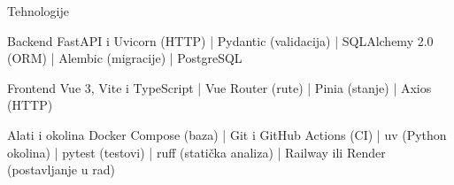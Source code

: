 

\begin{frame}{Tehnologije}
\begin{block}{Backend}
FastAPI i Uvicorn (HTTP) \;|\; Pydantic (validacija) \;|\; SQLAlchemy 2.0 (ORM) \;|\; Alembic (migracije) \;|\; PostgreSQL
\end{block}

\begin{block}{Frontend}
Vue 3, Vite i TypeScript \;|\; Vue Router (rute) \;|\; Pinia (stanje) \;|\; Axios (HTTP)
\end{block}

\begin{block}{Alati i okolina}
Docker Compose (baza) \;|\; Git i GitHub Actions (CI) \;|\; uv (Python okolina) \;|\; pytest (testovi) \;|\; ruff (statička analiza) \;|\; Railway ili Render (postavljanje u rad)
\end{block}

\end{frame}


